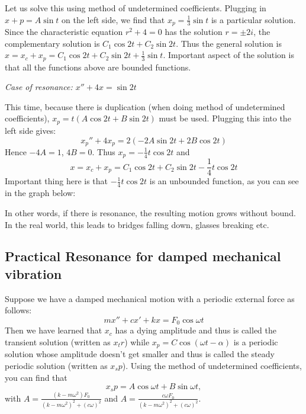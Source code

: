 \documentclass[12pt]{report}
\begin{document}
Let us solve this using method of undetermined coefficients. Plugging in $x+p= A \sin t$ on the left side, we find that $x_p = \frac{1}{3} \sin t$ is a particular solution.
Since the characteristic equation $r^2+4=0$  has the solution $r=\pm 2i$, the complementary solution is $C_1 \cos 2t + C_2 \sin 2t$.
Thus the general solution is $x=x_c+x_p = C_1 \cos 2t + C_2 \sin 2t+\frac{1}{3} \sin t$. Important aspect of the solution is that all the functions above are bounded functions.

\textit{Case of resonance: $x''+4x = \sin 2t $}

This time, because there is duplication (when doing method of undetermined coefficients), $x_p = t( A\cos 2t + B\sin 2t)$ must be used. Plugging this into the left side gives:
$$x_p''+4x_p = 2 (-2A \sin 2t + 2B \cos 2t)$$
Hence $-4A=1$, $4B=0$. Thus $x_p=-\frac{1}{4} t \cos 2t$ and
$$x=x_c+x_p = C_1 \cos 2t + C_2 \sin 2t-\frac{1}{4} t \cos 2t$$
Important thing here is that $-\frac{1}{4} t \cos 2t$ is an unbounded function, as you can see in the graph below:

\begin{center}
\end{center}


In other words, if there is resonance, the resulting motion grows without bound. In the real world, this leads to bridges falling down, glasses breaking etc.

\subsection*{Practical Resonance for damped mechanical vibration }
Suppose we have a damped mechanical motion with a periodic external force as follows:
$$ mx'' + cx'+kx = F_0 \cos \omega t$$
Then we have learned that $x_c$ has a dying amplitude and thus is called the transient solution (written as $x_tr$) while $x_p= C \cos (\omega t - \alpha)$ is a periodic solution whose amplitude doesn't get smaller and thus is called the steady periodic solution (written as $x_sp$).
Using the method of undetermined coefficients, you can find that
$$x_sp = A\cos \omega t + B\sin \omega t,$$
with $A = \frac{(k-m\omega^2)F_0}{(k-m\omega^2)^2+(c\omega)^2}$ and $A = \frac{c\omega F_0}{(k-m\omega^2)^2+(c\omega)^2}$.
\end{document}
